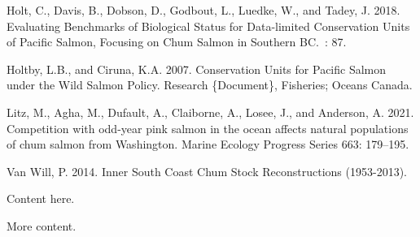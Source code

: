 \documentclass[11pt]{book}
\begin{document}
\begin{CSLReferences}{1}{0}
\leavevmode\hypertarget{ref-holt_evaluating_2018}{}%
Holt, C., Davis, B., Dobson, D., Godbout, L., Luedke, W., and Tadey, J. 2018. Evaluating {Benchmarks} of {Biological} {Status} for {Data}-limited {Conservation} {Units} of {Pacific} {Salmon}, {Focusing} on {Chum} {Salmon} in {Southern} {BC}.~: 87.

\leavevmode\hypertarget{ref-holtby_conservation_2007}{}%
Holtby, L.B., and Ciruna, K.A. 2007. Conservation {Units} for {Pacific} {Salmon} under the {Wild} {Salmon} {Policy}. Research \{Document\}, Fisheries; Oceans Canada.

\leavevmode\hypertarget{ref-litz_competition_2021}{}%
Litz, M., Agha, M., Dufault, A., Claiborne, A., Losee, J., and Anderson, A. 2021. Competition with odd-year pink salmon in the ocean affects natural populations of chum salmon from {Washington}. Marine Ecology Progress Series 663: 179--195.

\leavevmode\hypertarget{ref-van_will_inner_2014}{}%
Van Will, P. 2014. Inner {South} {Coast} {Chum} {Stock} {Reconstructions} (1953-2013).

\end{CSLReferences}
\setlength{\parindent}{0in} \setlength{\leftskip}{0in} \setlength{\parskip}{4pt}

\Appendices


\clearpage

\label{app:first-appendix}

Content here.


\clearpage

\label{app:second-appendix}

More content.
\end{document}
